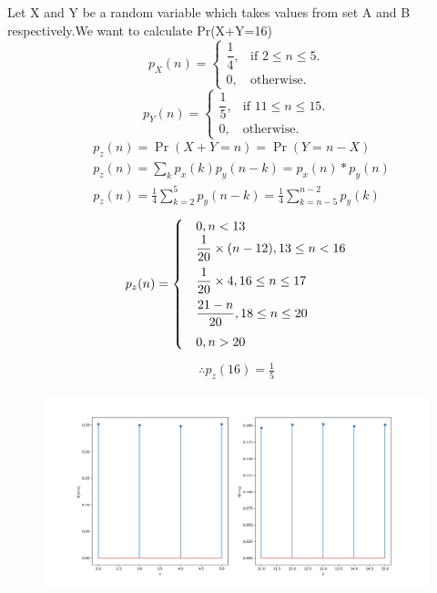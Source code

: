 


Let X and Y be a random variable which takes values from set A and B respectively.We want to calculate Pr(X+Y=16)
\begin{equation}
  p_X(n)=\begin{cases}
    \dfrac{1}{4}, & \text{if } 2\leq n\leq 5.\\
    0, & \text{otherwise}.
  \end{cases}
\end{equation}
\begin{equation}
  p_Y(n)=\begin{cases}
    \dfrac{1}{5}, & \text{if } 11\leq n\leq 15.\\
    0, & \text{otherwise}.
  \end{cases}
\end{equation}
\begin{align}
&p_z(n) = \Pr(X+Y = n) = \Pr(Y=n-X)\\
&p_z(n) = \sum_k p_x(k)p_y(n-k) = p_x(n) * p_y(n)\\
&p_z(n) = \frac{1}{4} \sum_{k=2}^5 p_y(n-k)=\frac{1}{4}\sum_{k=n-5}^{n-2} p_y(k)
\end{align}
\begin{equation}
  p_z(n)=\begin{cases}
  &0 , n < 13\\
  &\dfrac{1}{20}\times (n-12) ,13 \leq n < 16\vspace{0.2cm}\\
  &\dfrac{1}{20} \times 4 , 16 \leq n \leq 17\vspace{0.2cm}\\
  &\dfrac{21-n}{20} , 18 \leq n \leq 20\vspace{0.2cm}\\
  & 0 ,n > 20
  \end{cases}
\end{equation}
\begin{align}
\therefore p_z(16) = \frac{1}{5}
\end{align}
\begin{figure}[h]
    \centering
    \includegraphics[width=\columnwidth]{solutions/cs/2015/3/figures/assignment4_plot2.png}
\end{figure}
